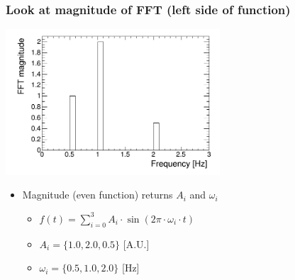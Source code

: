 \documentclass[bigger]{beamer}
\begin{document}
\begin{frame}
\frametitle{Look at magnitude of FFT (left side of function)}
\label{sec-2-1-3}
\label{sec-2-1-3-1}

\centering
\includegraphics[width=0.6\textwidth]{fig/tutorial_FFT_magnitude_scaled.png}
\begin{itemize}

\item Magnitude (even function) returns \(A_{i}\) and \(\omega_{i}\)
\label{sec-2-1-3-2}%
\begin{itemize}

\item \(f(t) = \sum_{i = 0}^3 A_{i} \cdot \sin (2\pi \cdot \omega_{i} \cdot t)\)
\label{sec-2-1-3-2-1}%

\item \(A_{i} = \{1.0, 2.0, 0.5\}\) [A.U.]
\label{sec-2-1-3-2-2}%

\item \(\omega_{i} = \{0.5, 1.0, 2.0\}\) [Hz]
\label{sec-2-1-3-2-3}%
\end{itemize} %
\end{itemize} %
\end{frame}
\end{document}
